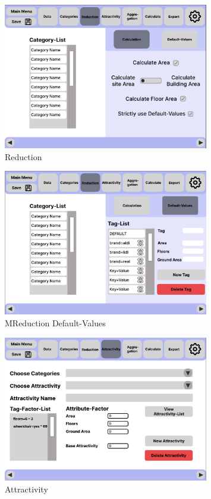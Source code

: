 \documentclass[parskip=full]{scrartcl} %
\begin{document}
\begin{figure}
    \centering
    \includegraphics[width=0.8\textwidth,cfbox=black 1pt 0pt]{pictures/Reduction.png}
    \caption{Reduction}
\end{figure}

\begin{figure}
    \centering
    \includegraphics[width=0.8\textwidth,cfbox=black 1pt 0pt]{pictures/Reduction 2.png}
    \caption{MReduction Default-Values}
\end{figure}

\begin{figure}
    \centering
    \includegraphics[width=0.8\textwidth,cfbox=black 1pt 0pt]{pictures/Attractivity.png}
    \caption{Attractivity}
\end{figure}
\end{document}
